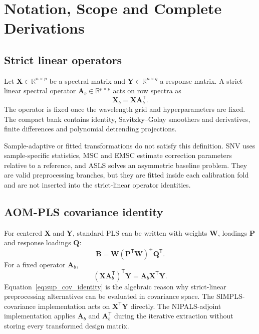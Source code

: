 \documentclass[11pt,a4paper]{article}
\newcommand{\X}{\mathbf{X}}
\newcommand{\Y}{\mathbf{Y}}
\newcommand{\A}{\mathbf{A}}
\newcommand{\B}{\mathbf{B}}
\newcommand{\transpose}{^{\mathsf T}}
\begin{document}
\section{Notation, Scope and Complete Derivations}

\subsection{Strict linear operators}

Let $\X\in\mathbb{R}^{n\times p}$ be a spectral matrix and
$\Y\in\mathbb{R}^{n\times q}$ a response matrix.  A strict linear spectral
operator $\A_b\in\mathbb{R}^{p\times p}$ acts on row spectra as
\begin{equation}
  \X_b=\X\A_b\transpose .
\end{equation}
The operator is fixed once the wavelength grid and hyperparameters are fixed.
The compact bank contains identity, Savitzky--Golay smoothers and
derivatives, finite differences and polynomial detrending projections.

Sample-adaptive or fitted transformations do not satisfy this definition.
SNV uses sample-specific statistics, MSC and EMSC estimate correction
parameters relative to a reference, and ASLS solves an asymmetric baseline
problem.  They are valid preprocessing branches, but they are fitted inside
each calibration fold and are not inserted into the strict-linear operator
identities.

\subsection{AOM-PLS covariance identity}

For centered $\X$ and $\Y$, standard PLS can be written with weights
$\mathbf W$, loadings $\mathbf P$ and response loadings $\mathbf Q$:
\begin{equation}
  \B=\mathbf W(\mathbf P\transpose\mathbf W)^+\mathbf Q\transpose .
\end{equation}
For a fixed operator $\A_b$,
\begin{equation}
  (\X\A_b\transpose)\transpose\Y
  =
  \A_b\X\transpose\Y .
  \label{eq:sup_cov_identity}
\end{equation}
Equation~\ref{eq:sup_cov_identity} is the algebraic reason why strict-linear
preprocessing alternatives can be evaluated in covariance space.  The
SIMPLS-covariance implementation acts on $\X\transpose\Y$ directly.  The
NIPALS-adjoint implementation applies $\A_b$ and $\A_b\transpose$ during the
iterative extraction without storing every transformed design matrix.
\end{document}
